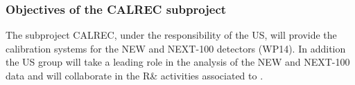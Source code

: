 %
%

\subsubsection*{Objectives of the CALREC subproject}

The subproject CALREC, under the responsibility of the US, will provide the calibration systems for the NEW and NEXT-100 detectors (WP14).
In addition the US group will 
take a leading role in the analysis of the NEW and NEXT-100 data  and will collaborate  in the R\& activities associated to \BATA. 

